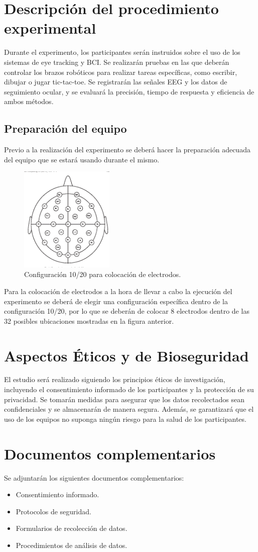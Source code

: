 \documentclass[12pt]{article}
\begin{document}
\newpage
\section{Descripción del procedimiento experimental}
Durante el experimento, los participantes serán instruidos sobre el uso de los sistemas de eye tracking y BCI. Se realizarán pruebas en las que deberán controlar los brazos robóticos para realizar tareas específicas, como escribir, dibujar o jugar tic-tac-toe. Se registrarán las señales EEG y los datos de seguimiento ocular, y se evaluará la precisión, tiempo de respuesta y eficiencia de ambos métodos.

\subsection{Preparación del equipo}
Previo a la realización del experimento se deberá hacer la preparación adecuada del equipo que se estará usando durante el mismo.

\begin{figure}[H]
    \centering
    \includegraphics[width=0.4\textwidth]{recursos_img/configuracion_diagrama_10_20.png}
    \caption{Configuración 10/20 para colocación de electrodos.}
    \label{fig:configuracion}
\end{figure}

Para la colocación de electrodos a la hora de llevar a cabo la ejecución del experimento se deberá de elegir una configuración específica dentro de la configuración 10/20, por lo que se deberán de colocar 8 electrodos dentro de las 32 posibles ubicaciones mostradas en la figura anterior.

\section{Aspectos Éticos y de Bioseguridad}
El estudio será realizado siguiendo los principios éticos de investigación, incluyendo el consentimiento informado de los participantes y la protección de su privacidad. Se tomarán medidas para asegurar que los datos recolectados sean confidenciales y se almacenarán de manera segura. Además, se garantizará que el uso de los equipos no suponga ningún riesgo para la salud de los participantes.

\section{Documentos complementarios}
Se adjuntarán los siguientes documentos complementarios:

\begin{itemize}
    \item Consentimiento informado.
    \item Protocolos de seguridad.
    \item Formularios de recolección de datos.
    \item Procedimientos de análisis de datos.
\end{itemize}
\end{document}
